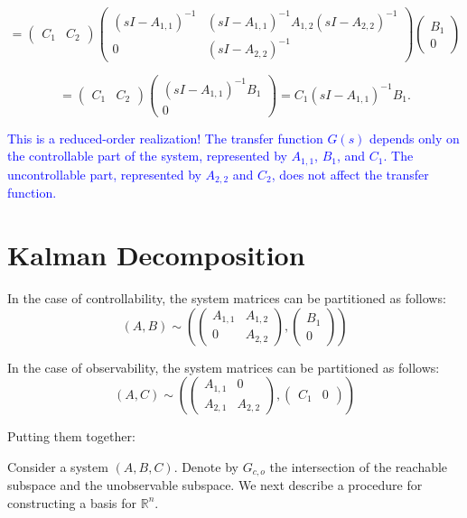 \documentclass{article}
\begin{document}
\[
= \begin{pmatrix}
C_1 & C_2
\end{pmatrix}
\begin{pmatrix}
(sI - A_{1,1})^{-1} & (sI - A_{1,1})^{-1}A_{1,2}(sI - A_{2,2})^{-1} \\
0 & (sI - A_{2,2})^{-1}
\end{pmatrix}
\begin{pmatrix}
B_1 \\
0
\end{pmatrix}
\]

\[
= \begin{pmatrix}
C_1 & C_2
\end{pmatrix}
\begin{pmatrix}
(sI - A_{1,1})^{-1}B_1 \\
0
\end{pmatrix}
= C_1(sI - A_{1,1})^{-1}B_1.
\]

\textcolor{blue}{This is a reduced-order realization! The transfer function $G(s)$ depends only on the controllable part of the system, represented by $A_{1,1}$, $B_1$, and $C_1$. The uncontrollable part, represented by $A_{2,2}$ and $C_2$, does not affect the transfer function.}

\section{Kalman Decomposition}

In the case of controllability, the system matrices can be partitioned as follows:
\[
(A, B) \sim \left( \begin{pmatrix}
A_{1,1} & A_{1,2} \\
0 & A_{2,2}
\end{pmatrix}, \begin{pmatrix}
B_1 \\
0
\end{pmatrix} \right)
\]

In the case of observability, the system matrices can be partitioned as follows:
\[
(A, C) \sim \left( \begin{pmatrix}
A_{1,1} & 0 \\
A_{2,1} & A_{2,2}
\end{pmatrix}, \begin{pmatrix}
C_1 & 0
\end{pmatrix} \right)
\]

Putting them together:

Consider a system $(A, B, C)$. Denote by $G_{c,o}$ the intersection of the reachable subspace and the unobservable subspace. We next describe a procedure for constructing a basis for $\mathbb{R}^n$.
\end{document}
